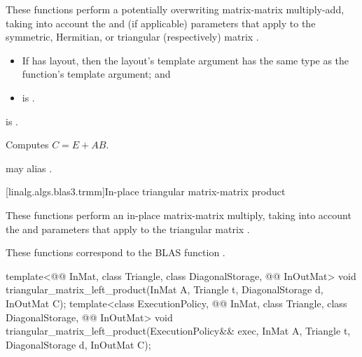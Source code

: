 \begin{itemdescr}
\pnum
These functions perform
a potentially overwriting matrix-matrix multiply-add,
taking into account
the  and  (if applicable) parameters
that apply to the symmetric, Hermitian, or triangular (respectively) matrix .

\pnum
\mandates
\begin{itemize}
\item
If  has  layout,
then the layout's  template argument has
the same type as the function's  template argument; and
\item
{} is .
\end{itemize}

\pnum
\expects
{} is .

\pnum
\effects
Computes $C = E + A B$.

\pnum
\remarks
{} may alias .
\end{itemdescr}

[linalg.algs.blas3.trmm]{In-place triangular matrix-matrix product}

\pnum
These functions perform
an in-place matrix-matrix multiply,
taking into account
the  and  parameters
that apply to the triangular matrix .
\begin{note}
These functions correspond to the BLAS function .
\end{note}

\begin{itemdecl}
template<@@ InMat, class Triangle, class DiagonalStorage, @@ InOutMat>
  void triangular_matrix_left_product(InMat A, Triangle t, DiagonalStorage d, InOutMat C);
template<class ExecutionPolicy,
         @@ InMat, class Triangle, class DiagonalStorage, @@ InOutMat>
  void triangular_matrix_left_product(ExecutionPolicy&& exec,
                                      InMat A, Triangle t, DiagonalStorage d, InOutMat C);
\end{itemdecl}

